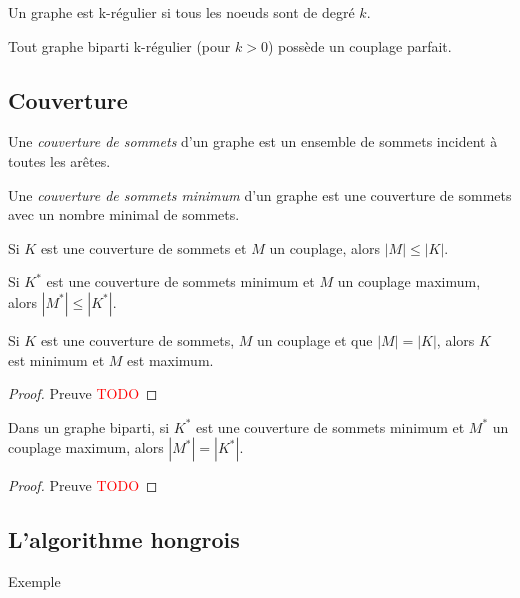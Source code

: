 \begin{myrem}
  Un graphe est k-régulier si tous les noeuds sont de degré $k$.
\end{myrem}

\begin{mycorr}
  Tout graphe biparti k-régulier (pour $k > 0$) possède un couplage parfait.
\end{mycorr}

\subsection{Couverture}
\begin{mydef}
  Une \emph{couverture de sommets} d’un graphe est un ensemble de sommets incident à toutes les arêtes.
\end{mydef}

\begin{mydef}
  Une \emph{couverture de sommets minimum} d’un graphe est une couverture de sommets avec un nombre minimal de sommets.
\end{mydef}

\begin{myrem}
  Si $K$ est une couverture de sommets et $M$ un couplage, alors $|M| \leq |K|$.
\end{myrem}

\begin{myrem}
  Si $K^*$ est une couverture de sommets minimum et $M$ un couplage maximum, alors $|M^*| \leq |K^*|$.
\end{myrem}

\begin{mylem}
  Si $K$ est une couverture de sommets, $M$ un couplage et que $|M| = |K|$, alors $K$ est minimum et $M$ est maximum.
  \begin{proof}
     Preuve \textcolor{red}{TODO}
  \end{proof}
\end{mylem}

\begin{mytheo} [König]
  Dans un graphe biparti, si $K^*$ est une couverture de sommets minimum et $M^*$ un couplage maximum, alors $|M^*| = |K^*|$.
  \begin{proof}
     Preuve \textcolor{red}{TODO}
  \end{proof}
\end{mytheo}

\subsection{L'algorithme hongrois}
\begin{myalgo}
\end{myalgo}
\begin{myexem}
  Exemple
\end{myexem}































